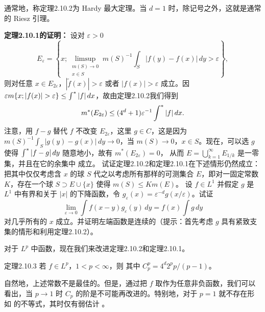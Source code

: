 通常地，称定理2.10.2为 Hardy 最大定理。当 $d=1$ 时，除记号之外，这就是通常的 Riesz 引理。

\textbf{定理2.10.1的证明：} 设对 $\varepsilon>0$
\[E_\varepsilon=\left\{x;\limsup_{\substack{m(S)\to0\\x\in S}}m(S)^{-1}\int_S|f(y)-f(x)|\,dy>\varepsilon\right\},\]
则对任意 $x\in E_{2\varepsilon}$，$|\widetilde f(x)|>\varepsilon$ 或者 $|f(x)|>\varepsilon$ 成立。因 $\varepsilon m\{x;|f(x)|>\varepsilon\}\le\ustar|f|\dd$，故由定理2.10.2我们得到
\[m^*(E_{2\varepsilon})\le(4^d+1)\varepsilon^{-1}\int^{*}|f|\,dx.\]
注意，用 $f-g$ 替代 $f$ 不改变 $E_{2\varepsilon}$，这里 $g\in C$，这是因为 $m(S)^{-1}\int_S|g(y)-g(x)|\,dy\to0$，当 $m(S)\to0$，$x\in S$。现在，可以选 $g$ 使得 $\int^{*}|f-g|\,dy$ 随意地小，故有 $m^*(E_{2\varepsilon})=0$，
从而 $E=\bigcup_{k=1}^\infty E_{1/k}$ 是一零集，并且在它的余集中  成立。
\Exercise 试证定理2.10.2和定理2.10.1在下述情形仍然成立：把其中仅仅考虑含 $x$ 的球 $S$ 代之以考虑所有那样的可测集合 $E$，即对一固定常数 $K$，存在一个球 $S\supset E\cup\{x\}$ 使得 $m(S)\le Km(E)$。
\Exercise 设 $f\in L^1$ 并假定 $g$ 是 $L^1$ 中有界和关于 $|x|$ 的下降函数，令 $g_\varepsilon(x)=\varepsilon^{-d}g(x/\varepsilon)$。试证
\[\lim_{\varepsilon\to0}\int f(x-y)g_\varepsilon(y)\,dy=f(x)\int g\,dy\]
对几乎所有的 $x$ 成立。并证明左端函数是连续的（提示：首先考虑 $g$ 具有紧致支集的情形和利用定理2.10.2）。

对于 $L^p$ 中函数，现在我们来改进定理2.10.2和定理2.10.1。
\begin{statement}{定理}{2.10.3}
若 $f\in L^p$，$1<p<\infty$，则
其中 $C_p^p=4^d2^pp/(p-1)$。
\end{statement}
自然地，上述常数不是最佳的。但是，通过把 $f$ 取作为任意非负函数，我们可以看出，当 $p\to1$ 时 $C_p$ 的阶是不可能再改进的。特别地，对于 $p=1$ 就不存在形如  的不等式，其时仅有弱估计 。

